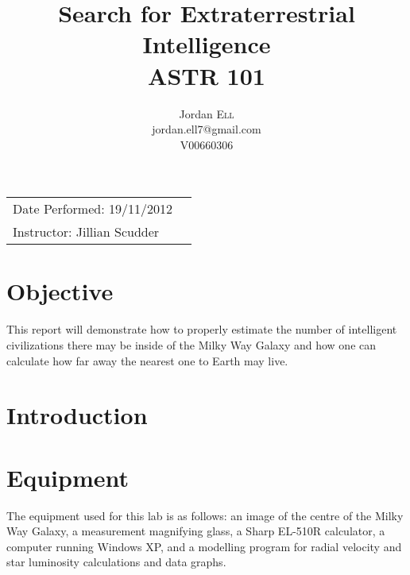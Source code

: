 \documentclass{article}
\title{Search for Extraterrestrial Intelligence \\ ASTR 101} %
\author{Jordan \textsc{Ell} \\ jordan.ell7@gmail.com \\ V00660306} %
\begin{document}
\maketitle %

\begin{tabular}{lr}
Date Performed: 19/11/2012\\ %
Instructor: Jillian Scudder %
\end{tabular}

\setlength\parindent{0pt} %

\renewcommand{\labelenumi}{\alph{enumi}.} %


\section{Objective}

This report will demonstrate how to properly estimate the number of intelligent civilizations there may be inside of the Milky Way Galaxy and
how one can calculate how far away the nearest one to Earth may live. \\
 

\section{Introduction}




\section{Equipment}

The equipment used for this lab is as follows: an image of the centre of the Milky Way Galaxy, a measurement magnifying glass,
 a Sharp EL-510R calculator, a computer running Windows XP, and a modelling program for radial velocity and star luminosity 
calculations and data graphs.
\end{document}
